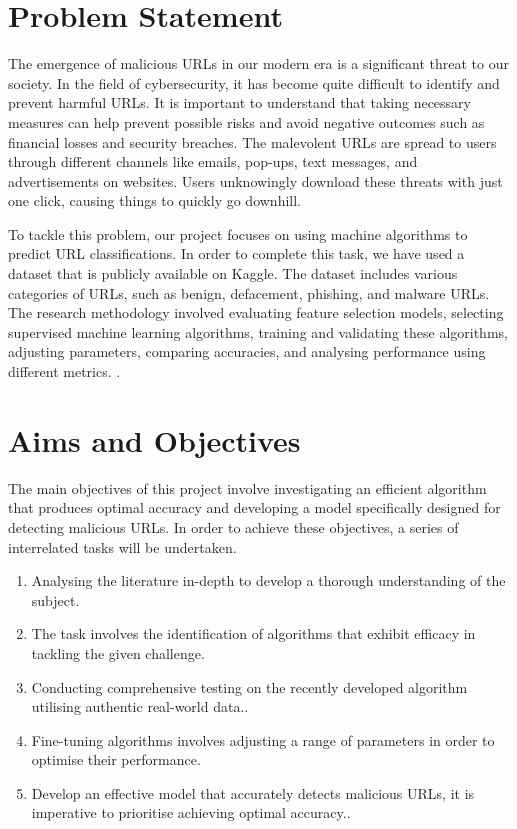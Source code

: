 \section{Problem Statement}


The emergence of malicious URLs in our modern era is a significant threat to our society. In the field of cybersecurity, it has become quite difficult to identify and prevent harmful URLs. It is important to understand that taking necessary measures can help prevent possible risks and avoid negative outcomes such as financial losses and security breaches. The malevolent URLs are spread to users through different channels like emails, pop-ups, text messages, and advertisements on websites. Users unknowingly download these threats with just one click, causing things to quickly go downhill.

To tackle this problem, our project focuses on using machine algorithms to predict URL classifications. In order to complete this task, we have used a dataset that is publicly available on Kaggle. The dataset includes various categories of URLs, such as benign, defacement, phishing, and malware URLs. The research methodology involved evaluating feature selection models, selecting supervised machine learning algorithms, training and validating these algorithms, adjusting parameters, comparing accuracies, and analysing performance using different metrics.
.

\section{Aims and Objectives}
The main objectives of this project involve investigating an efficient algorithm that produces optimal accuracy and developing a model specifically designed for detecting malicious URLs. In order to achieve these objectives, a series of interrelated tasks will be undertaken.
\begin{enumerate}
	\item Analysing the literature in-depth to develop a thorough understanding of the subject.
	\item The task involves the identification of algorithms that exhibit efficacy in tackling the given challenge. 
	\item Conducting comprehensive testing on the recently developed algorithm utilising authentic real-world data..
	\item Fine-tuning algorithms involves adjusting a range of parameters in order to optimise their performance.
	\item Develop an effective model that accurately detects malicious URLs, it is imperative to prioritise achieving optimal accuracy.. 
\end{enumerate}


